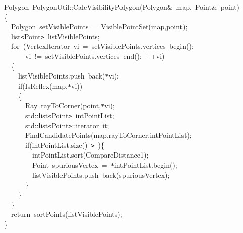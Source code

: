 {
\noindent \ttfamily
\jttstylek Polygon~PolygonUtil::CalcVisibilityPolygon\jttstylei (\jttstylek Polygon\&~map,~Point\&~point\jttstylei )\\
\jttstylei \{\\
\jttstylea ~~\jttstylek Polygon~setVisiblePoints~=~VisiblePointSet\jttstylei (\jttstylek map,point\jttstylei )\jttstylek ;\\
\jttstylea ~~\jttstylek list\verb#<#Point\verb#>#~listVisiblePoints;\\
\jttstylea ~~\jttstylee for~\jttstylei (\jttstylek VertexIterator~vi~=~setVisiblePoints.vertices\verb#_#begin\jttstylei ()\jttstylek ;\\
\jttstylea ~~~~~~\jttstylek vi~!=~setVisiblePoints.vertices\verb#_#end\jttstylei ()\jttstylek ;~++vi\jttstylei )\\
\jttstylea ~~\jttstylei \{\\
\jttstylea ~~~~\jttstylek listVisiblePoints.push\verb#_#back\jttstylei (\jttstylek \verb#*#vi\jttstylei )\jttstylek ;\\
\jttstylea ~~~~\jttstylee if\jttstylei (\jttstylek IsReflex\jttstylei (\jttstylek map,\verb#*#vi\jttstylei ))\\
\jttstylea ~~~~\jttstylei \{\\
\jttstylea ~~~~~~\jttstylek Ray~rayToCorner\jttstylei (\jttstylek point,\verb#*#vi\jttstylei )\jttstylek ;\\
\jttstylea ~~~~~~\jttstylek std::list\verb#<#Point\verb#>#~intPointList;\\
\jttstylea ~~~~~~\jttstylek std::list\verb#<#Point\verb#>#::iterator~it;\\
\jttstylea ~~~~~~\jttstylek FindCandidatePoints\jttstylei (\jttstylek map,rayToCorner,intPointList\jttstylei )\jttstylek ;\\
\jttstylea ~~~~~~\jttstylee if\jttstylei (\jttstylek intPointList.size\jttstylei ()~\jttstylek \verb#>#~\jttstylei )\{\\
\jttstylea ~~~~~~~~\jttstylek intPointList.sort\jttstylei (\jttstylek CompareDistance1\jttstylei )\jttstylek ;\\
\jttstylea ~~~~~~~~\jttstylek Point~spuriousVertex~=~\verb#*#intPointList.begin\jttstylei ()\jttstylek ;\\
\jttstylea ~~~~~~~~\jttstylek listVisiblePoints.push\verb#_#back\jttstylei (\jttstylek spuriousVertex\jttstylei )\jttstylek ;\\
\jttstylea ~~~~~~\jttstylei \}\\
\jttstylea ~~~~\jttstylei \}\\
\jttstylea ~~\jttstylei \}\\
\jttstylea ~~\jttstylee return~\jttstylek sortPoints\jttstylei (\jttstylek listVisiblePoints\jttstylei )\jttstylek ;\\
\jttstylei \}\\

}

